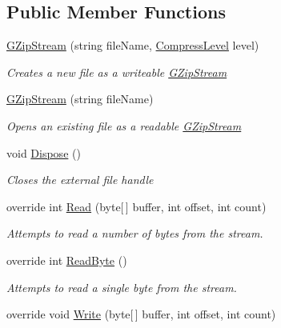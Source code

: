 \subsection*{Public Member Functions}
\begin{DoxyCompactItemize}
\item 
\hyperlink{class_dot_z_lib_1_1_g_zip_stream_a12d73ef46491a5023b1fd620efb13f1a}{G\+Zip\+Stream} (string file\+Name, \hyperlink{namespace_dot_z_lib_a034f7a1ef9856d8834e6f6b1c53d8a4c}{Compress\+Level} level)
\begin{DoxyCompactList}\small\item\em Creates a new file as a writeable \hyperlink{class_dot_z_lib_1_1_g_zip_stream}{G\+Zip\+Stream} \end{DoxyCompactList}\item 
\hyperlink{class_dot_z_lib_1_1_g_zip_stream_aea152a18b8cab1ee3d614fc3799c7e08}{G\+Zip\+Stream} (string file\+Name)
\begin{DoxyCompactList}\small\item\em Opens an existing file as a readable \hyperlink{class_dot_z_lib_1_1_g_zip_stream}{G\+Zip\+Stream} \end{DoxyCompactList}\item 
void \hyperlink{class_dot_z_lib_1_1_g_zip_stream_a1fab7340250fa883c12ab08502826d07}{Dispose} ()
\begin{DoxyCompactList}\small\item\em Closes the external file handle \end{DoxyCompactList}\item 
override int \hyperlink{class_dot_z_lib_1_1_g_zip_stream_a7f08839f681ed2eec9e3a87a0f1b0b0b}{Read} (byte\mbox{[}$\,$\mbox{]} buffer, int offset, int count)
\begin{DoxyCompactList}\small\item\em Attempts to read a number of bytes from the stream. \end{DoxyCompactList}\item 
override int \hyperlink{class_dot_z_lib_1_1_g_zip_stream_aedb91212e360ab574bca4745e2189201}{Read\+Byte} ()
\begin{DoxyCompactList}\small\item\em Attempts to read a single byte from the stream. \end{DoxyCompactList}\item 
override void \hyperlink{class_dot_z_lib_1_1_g_zip_stream_a844fcf0ab29c0bf26591e206669d485d}{Write} (byte\mbox{[}$\,$\mbox{]} buffer, int offset, int count)

\end{DoxyCompactItemize}
